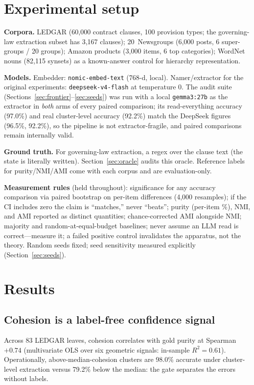 \documentclass[11pt]{article}
\begin{document}
\section{Experimental setup}\label{sec:setup}

\textbf{Corpora.} LEDGAR \cite{ledgar} (60{,}000 contract clauses, 100 provision types; the governing-law extraction subset has 3{,}167 clauses); 20~Newsgroups (6{,}000 posts, 6 super-groups / 20 groups); Amazon products (3{,}000 items, 6 top categories); WordNet nouns (82{,}115 synsets) as a known-answer control for hierarchy representation.

\textbf{Models.} Embedder: \texttt{nomic-embed-text} (768-d, local). Namer/extractor for the original experiments: \texttt{deepseek-v4-flash} at temperature 0. The audit suite (Sections~\ref{sec:frontier}--\ref{sec:seeds}) was run with a local \texttt{gemma3:27b} as the extractor in \emph{both} arms of every paired comparison; its read-everything accuracy (97.0\%) and real cluster-level accuracy (92.2\%) match the DeepSeek figures (96.5\%, 92.2\%), so the pipeline is not extractor-fragile, and paired comparisons remain internally valid.

\textbf{Ground truth.} For governing-law extraction, a regex over the clause text (the state is literally written). Section~\ref{sec:oracle} audits this oracle. Reference labels for purity/NMI/AMI come with each corpus and are evaluation-only.

\textbf{Measurement rules} (held throughout): significance for any accuracy comparison via paired bootstrap on per-item differences (4{,}000 resamples); if the CI includes zero the claim is ``matches,'' never ``beats''; purity (per-item \%), NMI, and AMI reported as distinct quantities; chance-corrected AMI alongside NMI; majority and random-at-equal-budget baselines; never assume an LLM read is correct---measure it; a failed positive control invalidates the apparatus, not the theory. Random seeds fixed; seed sensitivity measured explicitly (Section~\ref{sec:seeds}).

\section{Results}\label{sec:results}

\subsection{Cohesion is a label-free confidence signal}\label{sec:cohesion}
Across 83 LEDGAR leaves, cohesion correlates with gold purity at Spearman $+0.74$ (multivariate OLS over six geometric signals: in-sample $R^2=0.61$). Operationally, above-median-cohesion clusters are 98.0\% accurate under cluster-level extraction versus 79.2\% below the median: the gate separates the errors without labels.
\end{document}
